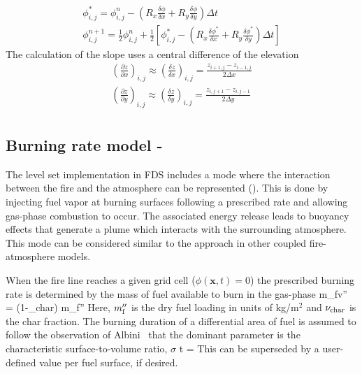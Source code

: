 \begin{gather}
\phi_{i, j}^{*} = \phi_{i, j}^{n}-\left(R_{x} \frac{\delta \phi}{\delta x}+R_{y} \frac{\delta \phi}{\delta y}\right) \Delta t \\[6pt]
\phi_{i, j}^{n+1} = \frac{1}{2} \phi_{i, j}^{n}+\frac{1}{2}\left[\phi_{i, j}^{*}-\left(R_{x} \frac{\delta \phi^{*}}{\delta x}+R_{y} \frac{\delta \phi^{*}}{\delta y}\right) \Delta t\right]
\end{gather}
The calculation of the slope uses a central difference of the elevation
\begin{gather}
\left(\frac{\partial z}{\partial x}\right)_{i, j} \approx \left(\frac{\delta z}{\delta x}\right)_{i, j} =
\frac{z_{i+1, j}-z_{i-1, j}}{2 \Delta x} \\[6pt]
\left(\frac{\partial z}{\partial y}\right)_{i, j} \approx \left(\frac{\delta z}{\delta y}\right)_{i, j} =
\frac{z_{i, j+1}-z_{i, j-1}}{2 \Delta y} \\[6pt]
\end{gather}


\subsection{Burning rate model - }

The level set implementation in FDS includes a mode where the interaction between the fire and the atmosphere can be represented (). This is done by injecting fuel vapor at burning surfaces following a prescribed rate and allowing gas-phase combustion to occur. The associated energy release leads to buoyancy effects that generate a plume which interacts with the surrounding atmosphere. This mode can be considered similar to the approach in other coupled fire-atmosphere models.

When the fire line reaches a given grid cell ($\phi(\mathbf{x},t)=0$) the prescribed burning rate is determined by the mass of fuel available to burn in the gas-phase
\be
   m_{\rm fv}'' = (1-\nu_{\rm char}) m_{\rm f}''
\ee
Here, $m_{\rm f}''$ is the dry fuel loading in units of kg/m$^2$ and $\nu_{\rm char}$ is the char fraction. The burning duration of a differential area of fuel is assumed to follow the observation of Albini~\cite{Albini:1976} that the dominant parameter is the characteristic surface-to-volume ratio, $\sigma$ 
\be
	\delta t = 
\ee
This can be superseded by a user-defined value per fuel surface, if desired.

